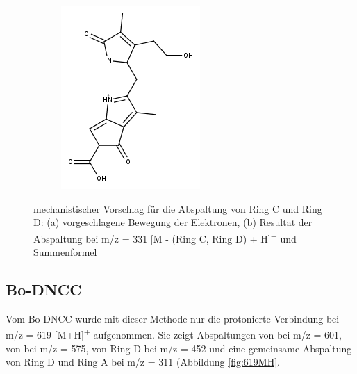 \begin{figure}[!htbp]
\begin{subfigure}[b]{0.5\textwidth}
    \includegraphics[width=\textwidth]{figures/Kapitel7/Kataboliten/fragmentation_structures/VWA_Katabolit_617-RingD-RingC_331.png}
    \caption{}
    \label{fig:331MH}
  \end{subfigure}
  \caption[Abspaltungsmechanismus von Ring C und Ring D bei Bo-DYCC, Quelle: Autor]{mechanistischer Vorschlag für die Abspaltung von Ring C und Ring D: (a) vorgeschlagene Bewegung der Elektronen, (b) Resultat der Abspaltung bei m/z = 331 [M - (Ring C, Ring D) + H]\textsuperscript{+} und Summenformel \ch{}}
\end{figure}

\subsection{Bo-DNCC}

Vom Bo-DNCC wurde mit dieser Methode nur die protonierte Verbindung bei m/z = 619 [M+H]\textsuperscript{+} aufgenommen. Sie zeigt Abspaltungen von  bei m/z = 601, von  bei m/z = 575, von Ring D bei m/z = 452 und eine gemeinsame Abspaltung von Ring D und Ring A bei m/z = 311 (Abbildung \ref{fig:619MH}. 

